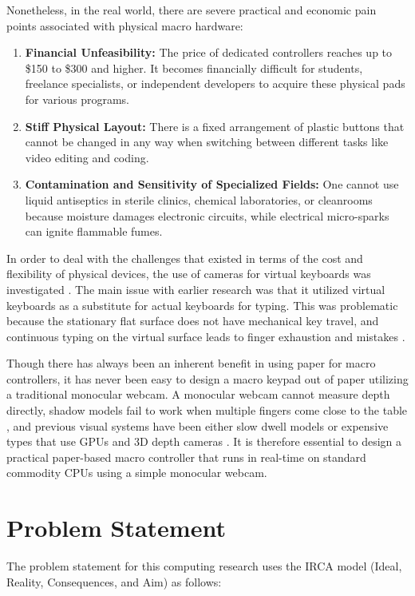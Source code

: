 Nonetheless, in the real world, there are severe practical and economic pain points associated with physical macro hardware:
\begin{enumerate}
    \item \textbf{Financial Unfeasibility:} The price of dedicated controllers reaches up to \$150 to \$300 and higher. It becomes financially difficult for students, freelance specialists, or independent developers to acquire these physical pads for various programs.
    \item \textbf{Stiff Physical Layout:} There is a fixed arrangement of plastic buttons that cannot be changed in any way when switching between different tasks like video editing and coding.
    \item \textbf{Contamination and Sensitivity of Specialized Fields:} One cannot use liquid antiseptics in sterile clinics, chemical laboratories, or cleanrooms because moisture damages electronic circuits, while electrical micro-sparks can ignite flammable fumes.
\end{enumerate}

In order to deal with the challenges that existed in terms of the cost and flexibility of physical devices, the use of cameras for virtual keyboards was investigated \cite{Zhang2001Visual, Srivastava2012RealTime, Khare2019QWERTY, Ji2018Local}. The main issue with earlier research was that it utilized virtual keyboards as a substitute for actual keyboards for typing. This was problematic because the stationary flat surface does not have mechanical key travel, and continuous typing on the virtual surface leads to finger exhaustion and mistakes \cite{ReviewVirtualKeyboard2020}.

Though there has always been an inherent benefit in using paper for macro controllers, it has never been easy to design a macro keypad out of paper utilizing a traditional monocular webcam. A monocular webcam cannot measure depth directly, shadow models fail to work when multiple fingers come close to the table \cite{Thomas2013Camera}, and previous visual systems have been either slow dwell models or expensive types that use GPUs and 3D depth cameras \cite{Lee2019Virtual, Kudale2016RealTime}. It is therefore essential to design a practical paper-based macro controller that runs in real-time on standard commodity CPUs using a simple monocular webcam.

\section{Problem Statement}
\label{sec:problem_statement}
The problem statement for this computing research uses the IRCA model (Ideal, Reality, Consequences, and Aim) as follows:

